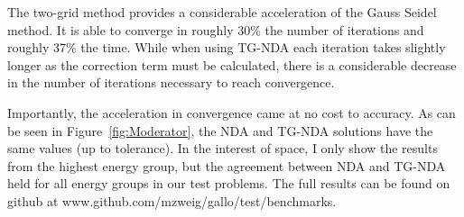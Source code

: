 The two-grid method provides a considerable acceleration of the Gauss Seidel method. It is able to converge in roughly 30\% the number of iterations and roughly 37\% the time. While when using TG-NDA each iteration takes slightly longer as the correction term must be calculated, there is a considerable decrease in the number of iterations necessary to reach convergence. 

Importantly, the acceleration in convergence came at no cost to accuracy. As can be seen in Figure~\ref{fig:Moderator}, the NDA and TG-NDA solutions have the same values (up to tolerance). In the interest of space, I only show the results from the highest energy group, but the agreement between NDA and TG-NDA held for all energy groups in our test problems. The full results can be found on github at www.github.com/mzweig/gallo/test/benchmarks.

